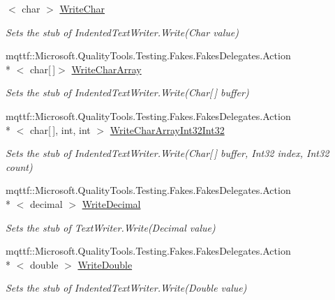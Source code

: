 \begin{DoxyCompactItemize}
$<$ char $>$ \hyperlink{class_system_1_1_code_dom_1_1_compiler_1_1_fakes_1_1_stub_indented_text_writer_a36ba337cb48da0bf02e5a654c7d74a8a}{Write\-Char}
\begin{DoxyCompactList}\small\item\em Sets the stub of Indented\-Text\-Writer.\-Write(\-Char value)\end{DoxyCompactList}\item 
mqttf\-::\-Microsoft.\-Quality\-Tools.\-Testing.\-Fakes.\-Fakes\-Delegates.\-Action\\*
$<$ char\mbox{[}$\,$\mbox{]}$>$ \hyperlink{class_system_1_1_code_dom_1_1_compiler_1_1_fakes_1_1_stub_indented_text_writer_a6f9f956d2af2255446ee9b8aaa486ee4}{Write\-Char\-Array}
\begin{DoxyCompactList}\small\item\em Sets the stub of Indented\-Text\-Writer.\-Write(\-Char\mbox{[}$\,$\mbox{]} buffer)\end{DoxyCompactList}\item 
mqttf\-::\-Microsoft.\-Quality\-Tools.\-Testing.\-Fakes.\-Fakes\-Delegates.\-Action\\*
$<$ char\mbox{[}$\,$\mbox{]}, int, int $>$ \hyperlink{class_system_1_1_code_dom_1_1_compiler_1_1_fakes_1_1_stub_indented_text_writer_a44674269df7a28939e1d2d43371c0231}{Write\-Char\-Array\-Int32\-Int32}
\begin{DoxyCompactList}\small\item\em Sets the stub of Indented\-Text\-Writer.\-Write(\-Char\mbox{[}$\,$\mbox{]} buffer, Int32 index, Int32 count)\end{DoxyCompactList}\item 
mqttf\-::\-Microsoft.\-Quality\-Tools.\-Testing.\-Fakes.\-Fakes\-Delegates.\-Action\\*
$<$ decimal $>$ \hyperlink{class_system_1_1_code_dom_1_1_compiler_1_1_fakes_1_1_stub_indented_text_writer_abfe9da42f55c26486c9885e2c6ed46ee}{Write\-Decimal}
\begin{DoxyCompactList}\small\item\em Sets the stub of Text\-Writer.\-Write(\-Decimal value)\end{DoxyCompactList}\item 
mqttf\-::\-Microsoft.\-Quality\-Tools.\-Testing.\-Fakes.\-Fakes\-Delegates.\-Action\\*
$<$ double $>$ \hyperlink{class_system_1_1_code_dom_1_1_compiler_1_1_fakes_1_1_stub_indented_text_writer_ae6acda772f2936f9d32db67a36564636}{Write\-Double}
\begin{DoxyCompactList}\small\item\em Sets the stub of Indented\-Text\-Writer.\-Write(\-Double value)\end{DoxyCompactList}\item 

\end{DoxyCompactItemize}
